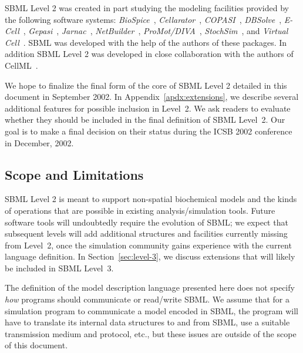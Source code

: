 \documentclass[10pt,twocolumntoc]{cekarticle}
\begin{document}
SBML Level 2 was created in part studying the modeling facilities provided
by the following software systems: \emph{BioSpice}~\citep{arkin:2001},
\emph{Cellarator}~\citep{shapiro:2000}, \emph{COPASI}~\citep{mendes:2000},
\emph{DBSolve}~\citep{goryanin:2001,goryanin:1999},
\emph{E-Cell}~\citep{tomita:1999,tomita:2001},
\emph{Gepasi}~\citep{mendes:1997,mendes:2001},
\emph{Jarnac}~\citep{sauro:2000,sauro:1991},
\emph{NetBuilder}~\citep{schilstra:2002},
\emph{ProMot/DIVA}~\citep{stelling:2001},
\emph{StochSim}~\citep{bray:2001,morton-firth:1998}, and \emph{Virtual
  Cell}~\citep{schaff:2000,schaff:2001}. SBML was developed with the help
of the authors of these packages.  In addition SBML Level 2 was developed
in close collaboration with the authors of CellML~\citep{Physiome:2001}.

We hope to finalize the final form of the core of SBML Level 2 detailed in
this document in September 2002.  In Appendix~\ref{apdx:extensions}, we
describe several additional features for possible inclusion in Level~2.
We ask readers to evaluate whether they should be included in the final
definition of SBML Level~2.  Our goal is to make a final decision on
their status during the ICSB 2002 conference in December, 2002.


\subsection{Scope and Limitations}

SBML Level 2 is meant to support non-spatial biochemical models
and the kinds of operations that are possible in existing
analysis/simulation tools.  Future software tools will undoubtedly require the
evolution of SBML; we expect that subsequent levels will add
additional structures and facilities currently missing from
Level~2, once the simulation community gains experience with the
current language definition. In Section~\ref{sec:level-3}, we
discuss extensions that will likely be included in SBML Level~3.

The definition of the model description language presented here does not
specify \emph{how} programs should communicate or read/write SBML.  We
assume that for a simulation program to communicate a model encoded in
SBML, the program will have to translate its internal data structures to
and from SBML, use a suitable transmission medium and protocol, etc., but
these issues are outside of the scope of this document.
\end{document}
